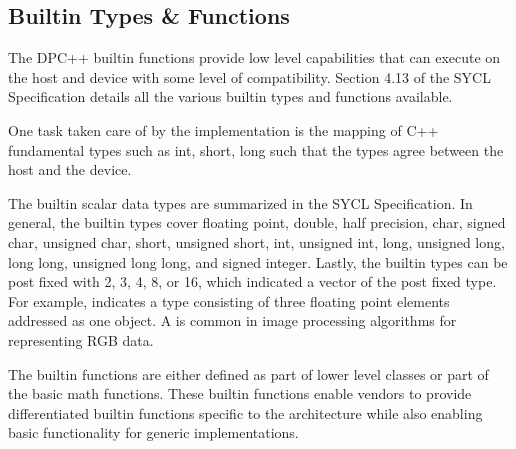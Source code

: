 \documentclass[letterpaper,10pt,english]{sphinxmanual}
\begin{document}
\subsection{Built\sphinxhyphen{}in Types \& Functions}
\label{\detokenize{programming-interface/built-in-types-_amp-functions:built-in-types-functions}}\label{\detokenize{programming-interface/built-in-types-_amp-functions:built-in-types-amp-functions}}\label{\detokenize{programming-interface/built-in-types-_amp-functions::doc}}
The DPC++ built\sphinxhyphen{}in functions provide low level capabilities that can
execute on the host and device with some level of compatibility. Section
4.13 of the SYCL Specification details all the various built\sphinxhyphen{}in types
and functions available.

One task taken care of by the implementation is the mapping of C++
fundamental types such as int, short, long such that the types agree
between the host and the device.

The built\sphinxhyphen{}in scalar data types are summarized in the SYCL Specification.
In general, the built\sphinxhyphen{}in types cover floating point, double, half
precision, char, signed char, unsigned char, short, unsigned short, int,
unsigned int, long, unsigned long, long long, unsigned long long, and
signed integer. Lastly, the built\sphinxhyphen{}in types can be post fixed with 2, 3,
4, 8, or 16, which indicated a vector of the post fixed type. For
example,  indicates a type consisting of three floating point
elements addressed as one object. A  is common in image
processing algorithms for representing RGB data.

The built\sphinxhyphen{}in functions are either defined as part of lower level classes
or part of the basic math functions. These built\sphinxhyphen{}in functions enable
vendors to provide differentiated built\sphinxhyphen{}in functions specific to the
architecture while also enabling basic functionality for generic
implementations.
\end{document}
